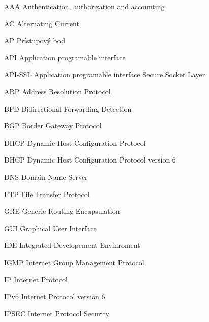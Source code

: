 \begin{seznamzkratek}{90}
	
		{AAA}								%
		{Authentication, authorization and accounting}		
		
		{AC}								%
		{Alternating Current}
	
		{AP}								%
		{Prístupový bod}	
	
		{API}								%
		{Application programable interface}
	
	
		{API-SSL}								%
		{Application programable interface Secure Socket Layer}	
	
		{ARP}								%
		{Address Resolution Protocol}	
		
		{BFD}								%
		{Bidirectional Forwarding Detection}	
	
	
		{BGP}								%
		{Border Gateway Protocol}		
	
		{DHCP}								%
		{Dynamic Host Configuration Protocol}
		
		{DHCP}								%
		{Dynamic Host Configuration Protocol version 6}		
	
		{DNS}								%
		{Domain Name Server}			
	
		{FTP}								%
		{File Transfer Protocol}		
	
		{GRE}								%
		{Generic Routing Encapsulation}			
	
		{GUI}								%
		{Graphical User Interface}	
	
		{IDE}								%
		{Integrated Developement Envinroment}
		
		{IGMP}								%
		{ Internet Group Management Protocol}		
	
		{IP}								%
		{Internet Protocol}	
		
		{IPv6}								%
		{Internet Protocol version 6}	
	
		{IPSEC}								%
		{Internet Protocol Security}
	

\end{seznamzkratek}
